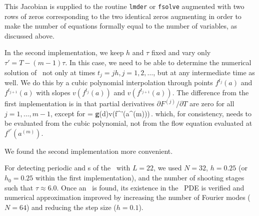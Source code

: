 This Jacobian is supplied to the routine {\tt lmder} or {\tt fsolve}
augmented with two rows of zeros corresponding to the two identical
zeros augmenting  in order to make the number of
equations formally equal to the number of variables, 
as discussed above.

In the second implementation, we keep $h$ and $\tau$ fixed and vary
only $\tau' = T - (m-1)\tau$.  In this case, we need to be able
to determine the numerical solution of \KSe\ not only at times 
$t_j = jh, j = 1, 2, \ldots$, but at any intermediate time as well.
We do this by a cubic polynomial interpolation through points
$f^{t_j}(a)$ and $f^{t_{j+1}}(a)$ with slopes $v(f^{t_j}(a))$ and
$v(f^{t_{j+1}}(a))$.  The difference from the first implementation
is in that partial derivatives $\partial F^{(j)}/\partial T$ are
zero for all $j = 1,\ldots,m-1$, except for
\beq
   = 
  {\bf g}(d)v(f^{\tau'}(a^{(m)}))\,.
\eeq
which, for consistency, needs to be evaluated from the cubic 
polynomial, not from the flow equation evaluated 
at $f^{\tau'}(a^{(m)})$.

We found the second implementation more convenient.

For detecting periodic and \rpo s of the \KSe\ with $L = 22$, we used
$N = 32$, $h = 0.25$ (or $h_0 = 0.25$ within the first implementation),
and the number of shooting stages such that $\tau \approx 6.0$.
Once an \rpo\ is found, its existence in the \KS\ PDE is verified 
and numerical approximation improved by increasing the number of
Fourier modes ($N = 64$) and reducing the step size ($h = 0.1$).  
